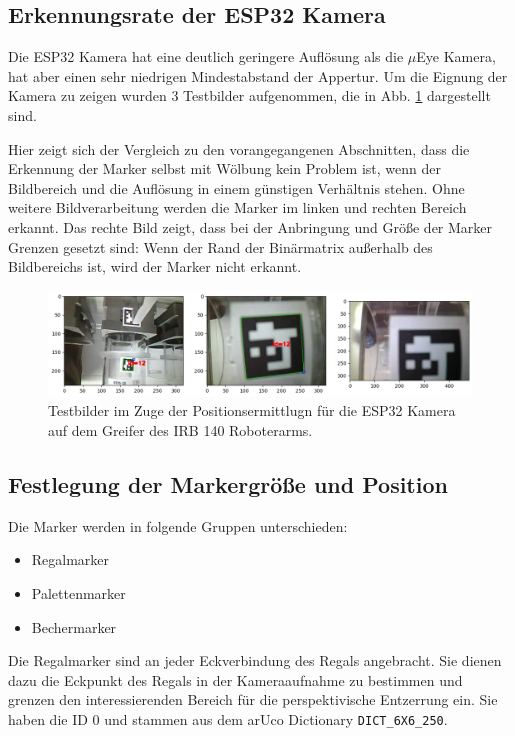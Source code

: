     \subsection{Erkennungsrate der ESP32 Kamera}\label{ErkennungsrateESP32}

    Die ESP32 Kamera hat eine deutlich geringere Auflösung als die $\mu$Eye Kamera, hat aber einen sehr niedrigen Mindestabstand der Appertur.
    Um die Eignung der Kamera zu zeigen wurden 3 Testbilder aufgenommen, die in Abb. \ref{fig:figure27} dargestellt sind.

    Hier zeigt sich der Vergleich zu den vorangegangenen Abschnitten, dass die Erkennung der Marker selbst mit Wölbung kein Problem ist, wenn der Bildbereich und die Auflösung in einem günstigen Verhältnis stehen.
    Ohne weitere Bildverarbeitung werden die Marker im linken und rechten Bereich erkannt. 
    Das rechte Bild zeigt, dass bei der Anbringung und Größe der Marker Grenzen gesetzt sind: 
    Wenn der Rand der Binärmatrix außerhalb des Bildbereichs ist, wird der Marker nicht erkannt.

    \begin{figure}
        \caption[Testbilder mit ESP 32 WebCam]{Testbilder im Zuge der Positionsermittlugn für die ESP32 Kamera auf dem Greifer des IRB 140 Roboterarms.}\label{fig:figure27}
        \includegraphics[width = \textwidth]{Bilder/ESP32CamTest.png}
        \centering
    \end{figure}

    \subsection{Festlegung der Markergröße und Position}

    Die Marker werden in folgende Gruppen unterschieden:
    \begin{itemize}
        \item Regalmarker
        \item Palettenmarker
        \item Bechermarker
    \end{itemize}
    Die Regalmarker sind an jeder Eckverbindung des Regals angebracht. Sie dienen dazu die Eckpunkt des Regals in der Kameraaufnahme zu bestimmen und 
    grenzen den interessierenden Bereich für die perspektivische Entzerrung ein. Sie haben die ID $0$ und stammen aus dem arUco Dictionary \verb|DICT_6X6_250|.

